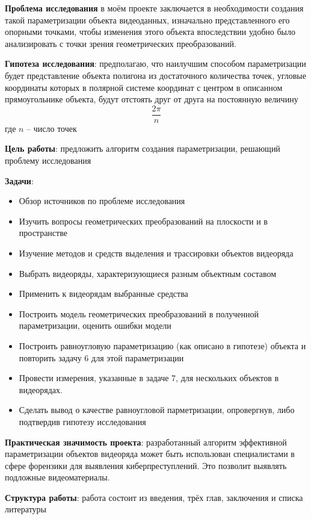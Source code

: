 \documentclass[]{article}
\begin{document}
	\textbf{Проблема исследования} в моём проекте заключается в необходимости создания такой параметризации объекта видеоданных, изначально представленного его опорными точками, чтобы изменения этого объекта впоследствии удобно было анализировать с точки зрения геометрических преобразований. 
	
	\textbf{Гипотеза исследования}: предполагаю, что наилучшим способом параметризации будет представление объекта полигона из достаточного количества точек, угловые координаты которых в полярной системе координат с центром в описанном прямоугольнике объекта, будут отстоять друг от друга на постоянную величину  $$\frac{2\pi}{n}$$ где $n$ – число точек
	
	\textbf{Цель работы}: предложить алгоритм создания параметризации, решающий проблему исследования
	
	\textbf{Задачи}: 
	\begin{itemize}[noitemsep]
		\item Обзор источников по проблеме исследования
		\item Изучить вопросы геометрических преобразований на плоскости и в пространстве
		\item Изучение методов и средств выделения и трассировки объектов видеоряда
		\item Выбрать видеоряды, характеризующиеся разным объектным составом
		\item Применить к видеорядам выбранные средства
		\item Построить модель геометрических преобразований в полученной параметризации, оценить ошибки модели
		\item Построить равноугловую параметризацию (как описано в гипотезе) объекта и повторить задачу 6 для этой параметризации
		\item Провести измерения, указанные в задаче 7, для нескольких объектов в видеорядах.
		\item Сделать вывод о качестве равноугловой парметризации, опровергнув, либо подтвердив гипотезу исследования
	\end{itemize}
	
	\textbf{Практическая значимость проекта}:
	разработанный алгоритм эффективной параметризации объектов видеоряда может быть использован специалистами в сфере форензики для выявления киберпреступлений. Это позволит выявлять подложные видеоматериалы.
	
	\textbf{Структура работы}: работа состоит из введения, трёх глав, заключения и  списка литературы 
	
\end{document}
